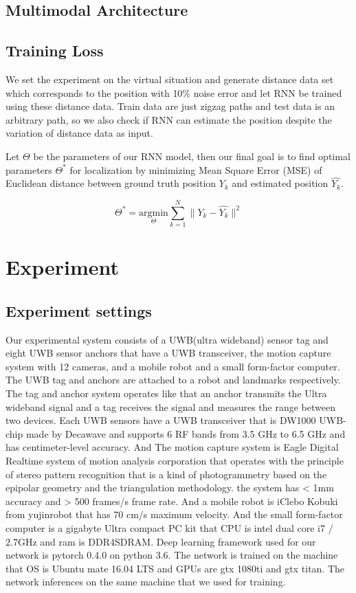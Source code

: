 \documentclass[letterpaper, 10 pt, conference]{ieeeconf}  %
\begin{document}
\subsection{Multimodal Architecture}

\subsection{Training Loss}

We set the experiment on the virtual situation and generate distance data set which corresponds to the position with 10\% noise error and let RNN be trained using these distance data. Train data are just zigzag paths and test data is an arbitrary path, so we also check if RNN can estimate the position despite the variation of distance data as input.

Let $\Theta$ be the parameters of our RNN model, then our final goal is to find optimal parameters $\Theta^{*}$ for localization by minimizing Mean Square Error (MSE) of Euclidean distance between ground truth position $Y_k$ and estimated position $\hat{Y_k}$.

\begin{equation}
\Theta^{*} = \underset{\Theta}{\mathrm{argmin}} \sum_{k=1}^N \parallel Y_k - \hat{Y_k} \parallel^{2}
\end{equation}  


\section{Experiment}


\subsection{Experiment settings} 

Our experimental system consists of a UWB(ultra wideband) sensor tag and eight UWB sensor anchors that have a UWB transceiver, the motion capture system with 12 cameras, and a mobile robot and a small form-factor computer. The UWB tag and anchors are attached to a robot and landmarks respectively. The tag and anchor system operates like that an anchor transmits the Ultra wideband signal and a tag receives the signal and measures the range between two devices. Each UWB sensors have a UWB transceiver that is DW1000 UWB-chip made by Decawave and supports 6 RF bands from 3.5 GHz to 6.5 GHz and has centimeter-level accuracy. And The motion capture system is Eagle Digital Realtime system of motion analysis corporation that operates with the principle of stereo pattern recognition that is a kind of photogrammetry based on the epipolar geometry and the triangulation methodology. the system has < 1mm accuracy and > 500 frames/s frame rate. And a mobile robot is iClebo Kobuki from yujinrobot that has 70 cm/s maximum velocity. And the small form-factor computer is a gigabyte Ultra compact PC kit that CPU is intel dual core i7 / 2.7GHz and ram is DDR4SDRAM.
Deep learning framework used for our network is pytorch 0.4.0 on python 3.6. The network is trained on the machine that OS is Ubuntu mate 16.04 LTS and GPUs are gtx 1080ti and gtx titan. The network inferences on the same machine that we used for training.
\end{document}
